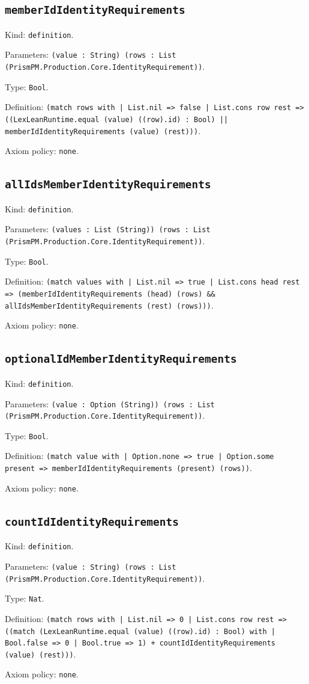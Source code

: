 \documentclass[11pt]{article}
\begin{document}
\subsection*{\texttt{memberIdIdentityRequirements}}
\noindent Kind: \texttt{definition}.\par
\noindent Parameters: \texttt{(value : String) (rows : List (PrismPM.Production.Core.IdentityRequirement))}.\par
\noindent Type: \texttt{Bool}.\par
\noindent Definition: \texttt{(match rows with | List.nil => false | List.cons row rest => ((LexLeanRuntime.equal (value) ((row).id) : Bool) || memberIdIdentityRequirements (value) (rest)))}.\par
\noindent Axiom policy: \texttt{none}.\par
\subsection*{\texttt{allIdsMemberIdentityRequirements}}
\noindent Kind: \texttt{definition}.\par
\noindent Parameters: \texttt{(values : List (String)) (rows : List (PrismPM.Production.Core.IdentityRequirement))}.\par
\noindent Type: \texttt{Bool}.\par
\noindent Definition: \texttt{(match values with | List.nil => true | List.cons head rest => (memberIdIdentityRequirements (head) (rows) \&\& allIdsMemberIdentityRequirements (rest) (rows)))}.\par
\noindent Axiom policy: \texttt{none}.\par
\subsection*{\texttt{optionalIdMemberIdentityRequirements}}
\noindent Kind: \texttt{definition}.\par
\noindent Parameters: \texttt{(value : Option (String)) (rows : List (PrismPM.Production.Core.IdentityRequirement))}.\par
\noindent Type: \texttt{Bool}.\par
\noindent Definition: \texttt{(match value with | Option.none => true | Option.some present => memberIdIdentityRequirements (present) (rows))}.\par
\noindent Axiom policy: \texttt{none}.\par
\subsection*{\texttt{countIdIdentityRequirements}}
\noindent Kind: \texttt{definition}.\par
\noindent Parameters: \texttt{(value : String) (rows : List (PrismPM.Production.Core.IdentityRequirement))}.\par
\noindent Type: \texttt{Nat}.\par
\noindent Definition: \texttt{(match rows with | List.nil => 0 | List.cons row rest => ((match (LexLeanRuntime.equal (value) ((row).id) : Bool) with | Bool.false => 0 | Bool.true => 1) + countIdIdentityRequirements (value) (rest)))}.\par
\noindent Axiom policy: \texttt{none}.\par
\end{document}
